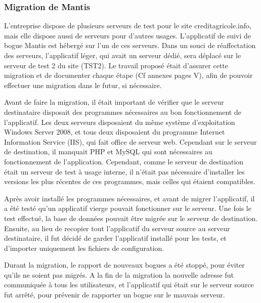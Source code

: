 \documentclass[12pt,a4paper]{article}
\begin{document}
\subsubsection{Migration de Mantis}
L'entreprise dispose de plusieurs serveurs de test pour le site creditagricole.info, mais elle dispose aussi de serveurs pour d'autres usages. L'applicatif de suivi de bogue Mantis est hébergé sur l'un de ces serveurs. Dans un souci de réaffectation des serveurs, l'applicatif léger, qui avait un serveur dédié, sera déplacé sur le serveur de test 2 du site (TST2). Le travail proposé était d'assurer cette migration et de documenter chaque étape (Cf annexes pages V), afin de pouvoir effectuer une migration dans le futur, si nécessaire.\par 
Avant de faire la migration, il était important de vérifier que le serveur destinataire disposait des programmes nécessaires au bon fonctionnement de l'applicatif. Les deux serveurs disposaient du même système d'exploitation Windows Server 2008, et tous deux disposaient du programme Internet Information Service (IIS), qui fait office de serveur web. Cependant sur le serveur de destination, il manquait \gls{PHP} et MySQL qui sont nécessaires au fonctionnement de l'application. Cependant, comme le serveur de destination était un serveur de test à usage interne, il n'était pas nécessaire d'installer les versions les plus récentes de ces programmes, mais celles qui étaient compatibles.\par 
Après avoir installé les programmes nécessaires, et avant de migrer l'applicatif, il a été testé qu'un applicatif vierge pouvait fonctionner sur le serveur. Une fois le test effectué, la base de données pouvait être migrée sur le serveur de destination. Ensuite, au lieu de recopier tout l'applicatif du serveur source au serveur destinataire, il fut décidé de garder l'applicatif installé pour les tests, et d'importer uniquement les fichiers de configuration.\par 
Durant la migration, le rapport de nouveaux bogues a été stoppé, pour éviter qu'ils ne soient pas migrés. A la fin de la migration la nouvelle adresse fut communiquée à tous les utilisateurs, et l'applicatif qui était sur le serveur source fut arrêté, pour prévenir de rapporter un bogue sur le mauvais serveur.\par

\newpage
\end{document}
